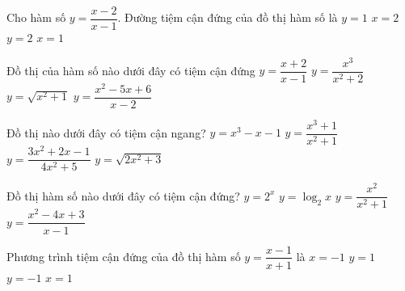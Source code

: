 \begin{ex}%
	Cho hàm số $y=\dfrac{x-2}{x-1}$. Đường tiệm cận đứng của đồ thị hàm số là
	\choice
	{$y=1$}
	{$x=2$}
	{$y=2$}
	{\True $x=1$}
\end{ex}

\begin{ex}%
	Đồ thị của hàm số nào dưới đây có tiệm cận đứng
	\choice
	{\True $y=\dfrac{x+2}{x-1}$}
	{$y=\dfrac{x^3}{x^2+2}$}
	{$y=\sqrt{x^2+1}$}
	{$y=\dfrac{x^2-5x+6}{x-2}$}
\end{ex}

\begin{ex}%
	Đồ thị nào dưới đây có tiệm cận ngang?
	\choice
	{$y=x^3-x-1$}
	{$y=\dfrac{x^3+1}{x^2+1}$}
	{\True $y=\dfrac{3x^2+2x-1}{4x^2+5}$}
	{$y=\sqrt{2x^2+3}$}
\end{ex}

\begin{ex}%
	Đồ thị hàm số nào dưới đây có tiệm cận đứng?
	\choice
	{$y=2^x$}
	{\True $y=\log_2x$}
	{$y=\dfrac{x^2}{x^2+1}$}
	{$y=\dfrac{x^2-4x+3}{x-1}$}
\end{ex}

\begin{ex}%
	Phương trình tiệm cận đứng của đồ thị hàm số $y=\dfrac{x-1}{x+1}$ là
	\choice
	{\True $x=-1$}
	{$y=1$}
	{$y=-1$}
	{$x=1$}
\end{ex}

